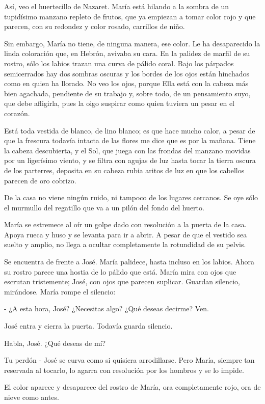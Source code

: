 \documentclass[12pt, twoside, openright]{book} %
\begin{document}
Así, veo el huertecillo de Nazaret. María está hilando a la sombra de un tupidísimo manzano repleto de frutos, que ya empiezan a tomar color rojo y que parecen, con su redondez y color rosado, carrillos de niño. 

Sin embargo, María no tiene, de ninguna manera, ese color. Le ha desaparecido la linda coloración que, en Hebrón, avivaba su cara. En la palidez de marfil de su rostro, sólo los labios trazan una curva de pálido coral. Bajo los párpados semicerrados hay dos sombras oscuras y los bordes de los ojos están hinchados como en quien ha llorado. No veo los ojos, porque Ella está con la cabeza más bien agachada, pendiente de su trabajo y, sobre todo, de un pensamiento suyo, que debe afligirla, pues la oigo suspirar como quien tuviera un pesar en el corazón.

Está toda vestida de blanco, de lino blanco; es que hace mucho calor, a pesar de que la frescura todavía intacta de las flores me dice que es por la mañana. Tiene la cabeza descubierta, y el Sol, que juega con las frondas del manzano movidas por un ligerísimo viento, y se filtra con agujas de luz hasta tocar la tierra oscura de los parterres, deposita en su cabeza rubia aritos de luz en que los cabellos parecen de oro cobrizo. 

De la casa no viene ningún ruido, ni tampoco de los lugares cercanos. Se oye sólo el murmullo del regatillo que va a un pilón del fondo del huerto. 

María se estremece al oír un golpe dado con resolución a la puerta de la casa. Apoya rueca y huso y se levanta para ir a abrir. A pesar de que el vestido sea suelto y amplio, no llega a ocultar completamente la rotundidad de su pelvis. 

Se encuentra de frente a José. María palidece, hasta incluso en los labios. Ahora su rostro parece una hostia de lo pálido que está. María mira con ojos que escrutan tristemente; José, con ojos que parecen suplicar. Guardan silencio, mirándose. María rompe el silencio: 

- ¿A esta hora, José? ¿Necesitas algo? ¿Qué deseas decirme? Ven. 

José entra y cierra la puerta. Todavía guarda silencio. 

Habla, José. ¿Qué deseas de mí? 

Tu perdón - José se curva como si quisiera arrodillarse. Pero María, siempre tan reservada al tocarlo, lo agarra con resolución por los hombros y se lo impide. 

El color aparece y desaparece del rostro de María, ora completamente rojo, ora de nieve como antes. 
\end{document}
